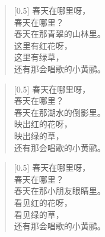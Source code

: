 \documentclass[12pt,UTF-8,openany]{ctexbook}
\begin{document}
\begin{large}
    
    \begin{verse}[0.5\linewidth]
        春天在哪里呀， \\
        春天在哪里？ \\
        春天在那青翠的山林里。 \\
        这里有红花呀， \\
        这里有绿草， \\
        还有那会唱歌的小黄鹂。
    \end{verse}
    
    
    \begin{verse}[0.5\linewidth]
        春天在哪里呀， \\
        春天在哪里？ \\
        春天在那湖水的倒影里。 \\
        映出红的花呀， \\
        映出绿的草， \\
        还有那会唱歌的小黄鹂。
    \end{verse}
    
    
    \begin{verse}[0.5\linewidth]
        春天在哪里呀， \\
        春天在哪里？ \\
        春天在那小朋友眼睛里。 \\
        看见红的花呀， \\
        看见绿的草， \\
        还有那会唱歌的小黄鹂。
    \end{verse}
    
\end{large}


\clearpage

\begin{center}
    
    
    
\end{center}


\hanzibox{}\hanzibox{}\hanzibox{}\hanzibox{}\hspace{1em}\hanzibox{}\hanzibox{}\hanzibox{}\hanzibox{}

\hanzibox{}\hanzibox{}\hanzibox{}\hanzibox{}\hspace{1em}\hanzibox{}\hanzibox{}\hanzibox{}\hanzibox{}
\end{document}
